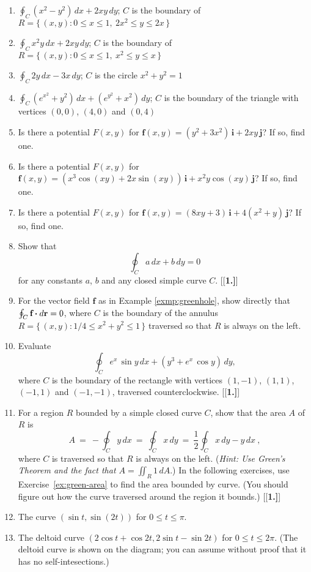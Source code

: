 \begin{enumerate}[\bfseries 1.]
 \item $\displaystyle\oint_C (x^2 - y^2 )\,dx + 2xy\,dy$; $C$ is the boundary
  of $R = \lbrace\,(x,y): 0 \le x \le 1,~2x^2 \le y \le 2x \,\rbrace$
 \item $\displaystyle\oint_C x^2 y\,dx + 2xy\,dy$; $C$ is the boundary
  of $R = \lbrace\,(x,y): 0 \le x \le 1,~x^2 \le y \le x \,\rbrace$
 \item $\displaystyle\oint_C 2y\,dx - 3x\,dy$; $C$ is the circle $x^2 + y^2 = 1$
 \item $\displaystyle\oint_C (e^{x^2} + y^2 )\,dx + (e^{y^2} + x^2 )\,dy$; $C$ is the boundary of the triangle with
  vertices $(0,0)$, $(4,0)$ and $(0,4)$
 \item Is there a potential $F(x,y)$ for $\mathbf{f}(x,y) = (y^2 + 3x^2 )\,\mathbf{i} + 2xy\,\mathbf{j}$?
  If so, find one.
 \item Is there a potential $F(x,y)$ for $\mathbf{f}(x,y) = (x^3 \cos (xy) + 2x \sin (xy))\,\mathbf{i} +
  x^2 y \cos (xy)\,\mathbf{j}$? If so, find one.
 \item Is there a potential $F(x,y)$ for $\mathbf{f}(x,y) = (8xy+3)\,\mathbf{i} +
  4(x^2 + y)\,\mathbf{j}$? If so, find one.
 \item Show that 
 \[\displaystyle\oint_C a\,dx + b\,dy = 0\]
 for any constants $a$, $b$ and any closed simple curve $C$.
[{[\bfseries 1.]}]
 \item For the vector field $\mathbf{f}$ as in Example \ref{exmp:greenhole}, show directly that
 $\oint_{C} \textbf{f} \bm{\cdot} d\textbf{r} = 0$, where
 $C$ is the boundary of the annulus $R =\lbrace\,(x,y): 1/4 \le x^2 + y^2 \le 1\,\rbrace$ traversed so that $R$ is
 always on the left.
 \item Evaluate \[\oint_C  e^x \,\sin y\,dx + (y^3 + e^x \,\cos y)\,dy,\] where $C$ is the boundary of the
  rectangle with vertices $(1,-1)$, $(1,1)$, $(-1,1)$ and $(-1,-1)$, traversed counterclockwise.
[{[\bfseries 1.]}]
 \item\label{ex:green-area} For a region $R$ bounded by a simple closed curve $C$, show that the area $A$ of $R$ is
  \begin{displaymath}
   A ~=~ -\oint_C y\,dx ~=~ \oint_C x\,dy ~=~ \frac{1}{2}\oint_C x\,dy - y\,dx ~,
  \end{displaymath}
  where $C$ is traversed so that $R$ is always on the left.
  (\emph{Hint: Use Green's Theorem and the fact that $A = \iint_{R} 1\,dA$}.)
In the following exercises, use Exercise~\ref{ex:green-area} to find the area bounded by curve. (You should figure out how the curve traversed around the region it bounds.) 
[{[\bfseries 1.]}]

\item The curve $(\sin t,\sin(2 t))$ for $0\le t\le \pi$.


\item The deltoid curve $(2\cos t+\cos 2t,2\sin t-\sin 2t)$ for $0\le t\le 2\pi$. 
(The deltoid curve is shown on the diagram; you can assume without proof that it has no self-intesections.)
\end{enumerate}

